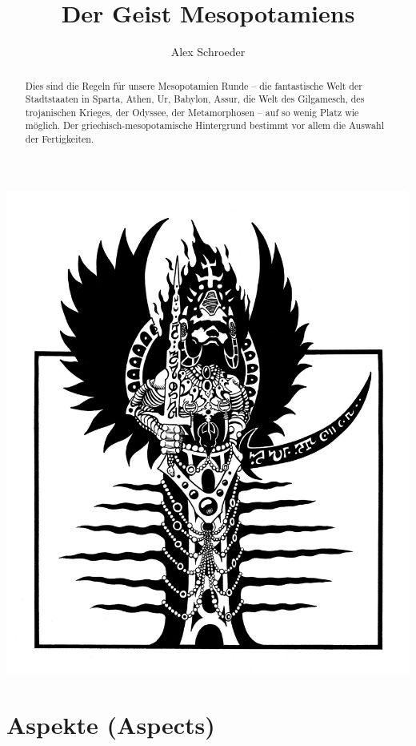 \documentclass{tufte-handout}
\title{Der Geist Mesopotamiens}
\author{Alex Schroeder}
\begin{document}
\maketitle%

\begin{marginfigure}
  \includegraphics{pazuzu_by_tillinghast23-d37j93m.jpg}
\end{marginfigure}

\begin{abstract}
\noindent Dies sind die Regeln für unsere Mesopotamien Runde -- die
fantastische Welt der Stadtstaaten in Sparta, Athen, Ur, Babylon,
Assur, die Welt des Gilgamesch, des trojanischen Krieges, der Odyssee,
der Metamorphosen -- auf so wenig Platz wie möglich. Der
griechisch-mesopotamische Hintergrund bestimmt vor allem die Auswahl
der Fertigkeiten.
\end{abstract}


\section{Aspekte (Aspects)}
\end{document}
